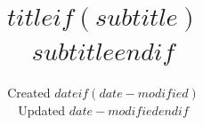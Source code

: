 \title{$title$$if(subtitle)$\\\large $subtitle$$endif$}
\author{}
\date{Created $date$$if(date-modified)$\\Updated $date-modified$$endif$}

